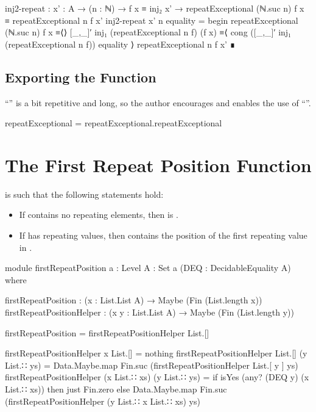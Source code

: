 \documentclass{report}
\begin{document}
\begin{code}
    inj2-repeat :
      {x' : A} →
      (n : ℕ) →
      f x ≡ inj₂ x' →
      repeatExceptional (ℕ.suc n) f x ≡ repeatExceptional n f x'
    inj2-repeat {x'} n equality = begin
      repeatExceptional (ℕ.suc n) f x
        ≡⟨⟩
      [_,_]′ inj₁ (repeatExceptional n f) (f x)
        ≡⟨ cong ([_,_]′ inj₁ (repeatExceptional n f)) equality ⟩
      repeatExceptional n f x' ∎
\end{code}

\subsection{Exporting the Function}
``'' is a bit repetitive and long, so the author encourages and enables the use of ``''.

\begin{code}
repeatExceptional = repeatExceptional.repeatExceptional
\end{code}

\section{The First Repeat Position Function}
 is such that the following statements hold:

\begin{itemize}
  \item If  contains no repeating elements, then    is .
  \item If  has repeating values, then    contains the position of the first repeating value in .
\end{itemize}

\begin{code}
module firstRepeatPosition
  {a : Level}
  {A : Set a}
  (DEQ : DecidableEquality A) where

  firstRepeatPosition : (x : List.List A) → Maybe (Fin (List.length x))
  firstRepeatPositionHelper : (x y : List.List A) → Maybe (Fin (List.length y))

  firstRepeatPosition = firstRepeatPositionHelper List.[]

  firstRepeatPositionHelper x List.[] = nothing
  firstRepeatPositionHelper List.[] (y List.∷ ys) =
    Data.Maybe.map Fin.suc (firstRepeatPositionHelper List.[ y ] ys)
  firstRepeatPositionHelper (x List.∷ xs) (y List.∷ ys) =
    if isYes (any? (DEQ y) (x List.∷ xs))
      then just Fin.zero
      else Data.Maybe.map Fin.suc (firstRepeatPositionHelper (y List.∷ x List.∷ xs) ys)
\end{code}
\end{document}
